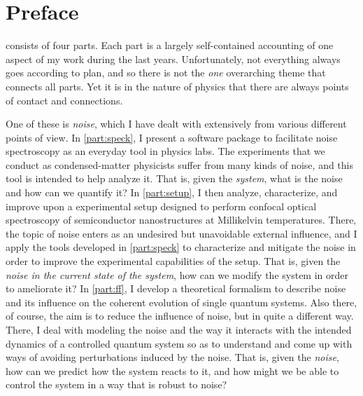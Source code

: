 \chapter*{Preface}

\Thethesis consists of four parts.
Each part is a largely self-contained accounting of one aspect of my work during the last years.
Unfortunately, not everything always goes according to plan, and so there is not the \emph{one} overarching theme that connects all parts.
Yet it is in the nature of physics that there are always points of contact and connections.

One of these is \emph{noise}, which I have dealt with extensively from various different points of view.
In \cref{part:speck}, I present a software package to facilitate noise spectroscopy as an everyday tool in physics labs.
The experiments that we conduct as condensed-matter physicists suffer from many kinds of noise, and this tool is intended to help analyze it.
That is, given the \emph{system}, what is the noise and how can we quantify it?
In \cref{part:setup}, I then analyze, characterize, and improve upon a experimental setup designed to perform confocal optical spectroscopy of semiconductor nanostructures at Millikelvin temperatures.
There, the topic of noise enters as an undesired but unavoidable external influence, and I apply the tools developed in \cref{part:speck} to characterize and mitigate the noise in order to improve the experimental capabilities of the setup.
That is, given the \emph{noise in the current state of the system}, how can we modify the system in order to ameliorate it?
In \cref{part:ff}, I develop a theoretical formalism to describe noise and its influence on the coherent evolution of single quantum systems.
Also there, of course, the aim is to reduce the influence of noise, but in quite a different way.
There, I deal with modeling the noise and the way it interacts with the intended dynamics of a controlled quantum system so as to understand and come up with ways of avoiding perturbations induced by the noise.
That is, given the \emph{noise}, how can we predict how the system reacts to it, and how might we be able to control the system in a way that is robust to noise?

